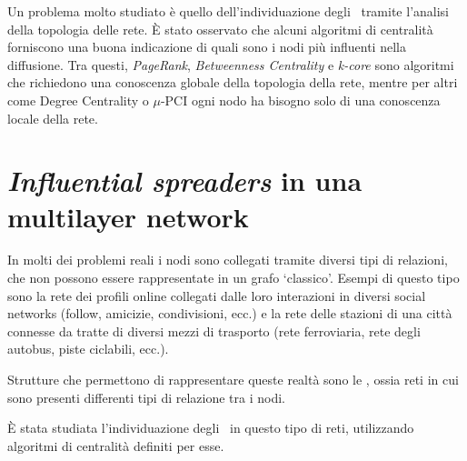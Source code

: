Un problema molto studiato è quello dell'individuazione degli \infsp\ tramite l'analisi della 
topologia delle rete\cite{kitsak:infsp}\cite{basaras:infsp}\cite{pei:infsp}.
È stato osservato che alcuni algoritmi di centralità forniscono una buona indicazione di 
quali sono i nodi più influenti nella diffusione. 
Tra questi, \textit{PageRank}, \textit{Betweenness Centrality} e \textit{k-core} sono algoritmi che richiedono una conoscenza
globale della topologia della rete, mentre per altri come Degree Centrality o $\mu$-PCI ogni nodo 
ha bisogno solo di una conoscenza locale della rete.

\section{\textit{Influential spreaders} in una multilayer network}

In molti dei problemi reali i nodi sono collegati tramite diversi tipi di relazioni, che non 
possono essere rappresentate in un grafo `classico'. 
Esempi di questo tipo sono la rete dei profili online collegati dalle loro interazioni
in diversi social networks (follow, amicizie, condivisioni, ecc.) e la rete delle stazioni di 
una città connesse da tratte di diversi mezzi di trasporto (rete ferroviaria, rete degli autobus, 
piste ciclabili, ecc.).

Strutture che permettono di rappresentare queste realtà sono le \mulns, ossia reti in cui sono 
presenti differenti tipi di relazione tra i nodi. 

È stata studiata l'individuazione degli \infsp\ in questo tipo di reti, utilizzando 
algoritmi di centralità definiti per esse.

